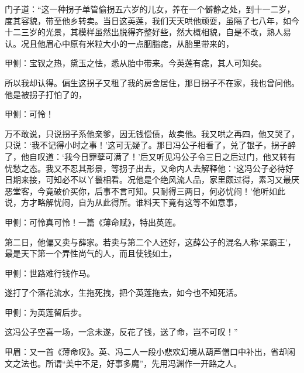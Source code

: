 \begin{parag}
    门子道：“这一种拐子单管偷拐五六岁的儿女，养在一个僻静之处，到十一二岁，度其容貌，带至他乡转卖。当日这英莲，我们天天哄他顽耍，虽隔了七八年，如今十二三岁的光景，其模样虽然出脱得齐整好些，然大概相貌，自是不改，熟人易认。况且他眉心中原有米粒大小的一点胭脂痣，从胎里带来的，\begin{note}甲侧：宝钗之热，黛玉之怯，悉从胎中带来。今英莲有痣，其人可知矣。\end{note}所以我却认得。偏生这拐子又租了我的房舍居住，那日拐子不在家，我也曾问他。他是被拐子打怕了的，\begin{note}甲侧：可怜！\end{note}万不敢说，只说拐子系他亲爹，因无钱偿债，故卖他。我又哄之再四，他又哭了，只说：‘我不记得小时之事！’这可无疑了。那日冯公子相看了，兑了银子，拐子醉了，他自叹道：‘我今日罪孽可满了！’后又听见冯公子令三日之后过门，他又转有忧愁之态。我又不忍其形景，等拐子出去，又命内人去解释他：‘这冯公子必待好日期来接，可知必不以丫鬟相看。况他是个绝风流人品，家里颇过得，素习又最厌恶堂客，今竟破价买你，后事不言可知。只耐得三两日，何必忧闷！’他听如此说，方才略解忧闷，自为从此得所。谁料天下竟有这等不如意事，\begin{note}甲侧：可怜真可怜！一篇《薄命赋》，特出英莲。\end{note}第二日，他偏又卖与薛家。若卖与第二个人还好，这薛公子的混名人称‘呆霸王’，最是天下第一个弄性尚气的人，而且使钱如土，\begin{note}甲侧：世路难行钱作马。\end{note}遂打了个落花流水，生拖死拽，把个英莲拖去，如今也不知死活。\begin{note}甲侧：为英莲留后步。\end{note}这冯公子空喜一场，一念未遂，反花了钱，送了命，岂不可叹！”\begin{note}甲眉：又一首《薄命叹》。英、冯二人一段小悲欢幻境从葫芦僧口中补出，省却闲文之法也。所谓“美中不足，好事多魔”，先用冯渊作一开路之人。\end{note}
\end{parag}


